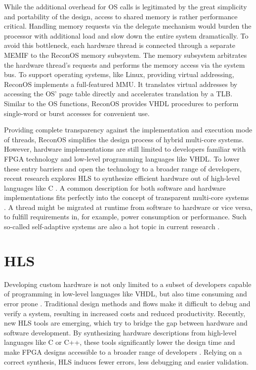 While the additional overhead for \ac{OS} calls is legitimated by the great
simplicity and portability of the design, access to shared memory is rather
performance critical. Handling memory requests via the delegate mechanism
would burden the processor with additional load and slow down the entire
system dramatically. To avoid this bottleneck, each hardware thread is
connected through a separate \ac{MEMIF} to the ReconOS memory subsystem. The
memory subsystem arbitrates the hardware thread's requests and performs the
memory access via the system bus. To support operating systems, like Linux,
providing virtual addressing, ReconOS implements a full-featured \ac{MMU}. It
translates virtual addresses by accessing the \ac{OS}' page table directly and
accelerates translation by a \ac{TLB}. Similar to the \ac{OS} functions,
ReconOS provides \ac{VHDL} procedures to perform single-word or burst accesses
for convenient use.

Providing complete transparency against the implementation and execution mode
of threads, ReconOS simplifies the design process of hybrid multi-core
systems. However, hardware implementations are still limited to developers
familiar with \ac{FPGA} technology and low-level programming languages like
\ac{VHDL}. To lower these entry barriers and open the technology to a broader
range of developers, recent research explores \ac{HLS} to synthesize efficient
hardware out of high-level languages like C \citep{SWL13}. A common
description for both software and hardware implementations fits perfectly into
the concept of transparent multi-core systems \citep{CBN11}. A thread might be
migrated at runtime from software to hardware or vice versa, to fulfill
requirements in, for example, power consumption or performance. Such so-called
self-adaptive systems are also a hot topic in current research
\citep{AHL14,HLP09}.

\section{\acl{HLS}}
Developing custom hardware is not only limited to a subset of developers
capable of programming in low-level languages like \ac{VHDL}, but also time
consuming and error prone \citep{SWL13}. Traditional design methods and flows
make it difficult to debug and verify a system, resulting in increased costs
and reduced productivity. Recently, new \ac{HLS} tools are emerging, which try
to bridge the gap between hardware and software development. By synthesizing
hardware descriptions from high-level languages like C or C++, these tools
significantly lower the design time and make \ac{FPGA} designs accessible to a
broader range of developers \citep{PeTh05}. Relying on a correct synthesis,
\ac{HLS} induces fewer errors, less debugging and easier validation.

